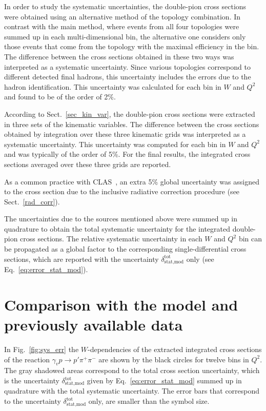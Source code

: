 \documentclass[prc,twocolumn,superscriptaddress,showpacs,amssymb,amsmath,amsfonts,aps,nofootinbib]{revtex4-1}
\begin{document}
In order to study the systematic uncertainties, the double-pion cross sections were obtained using an alternative method of the topology combination. In contrast with the main method, where events from all four topologies were summed up in each multi-dimensional bin, the alternative one considers only those events that come from the topology with the maximal efficiency in the bin. 
 The difference between the cross sections obtained in these two ways was interpreted as a systematic uncertainty.
Since various topologies correspond to different detected final hadrons,  this uncertainty includes the errors due to the hadron identification. 
This uncertainty was calculated for each bin in  $W$ and $Q^{2}$ and found to be of the order of 2\%.




According to Sect.~\ref{sec_kin_var}, the double-pion cross sections were extracted in three sets of the  kinematic variables. The difference between the cross sections obtained by integration over these three kinematic grids was interpreted as a systematic uncertainty. This  uncertainty was computed for each bin in $W$ and $Q^{2}$ and was typically of the order of 5\%.
For the final results, the integrated cross sections averaged over these three grids are reported.


As a common practice with CLAS~\cite{Fedotov:2008aa,Isupov:2017lnd},  an extra 5\% global uncertainty was assigned to the cross section due to the inclusive radiative correction procedure (see Sect.~\ref{rad_corr}).


The uncertainties due to the sources mentioned above were summed up in quadrature to obtain the total systematic uncertainty for the integrated double-pion cross sections. The relative systematic uncertainty in each $W$ and $Q^{2}$ bin can be propagated as a global factor to the corresponding single-differential cross sections, which are reported with the uncertainty $\delta_{\text{stat,mod}}^{\text{tot}}$ only (see Eq.~\eqref{eq:error_stat_mod}).


\section{Comparison with the model and previously available data}



In Fig.~\ref{fig:sys_err} the $W$-dependencies of the extracted integrated cross sections of the reaction $\gamma_{v} p \rightarrow p' \pi^{+} \pi^{-}$ are shown by the black circles for twelve bins in $Q^{2}$. The gray shadowed areas correspond to the total cross section uncertainty, which is the uncertainty $\delta^{\text{tot}}_{\text{stat,mod}}$ given by Eq.~\eqref{eq:error_stat_mod} summed up in quadrature with the total systematic uncertainty. The error bars that correspond to the uncertainty $\delta^{\text{tot}}_{\text{stat,mod}}$ only, are smaller than the symbol size.
\end{document}

